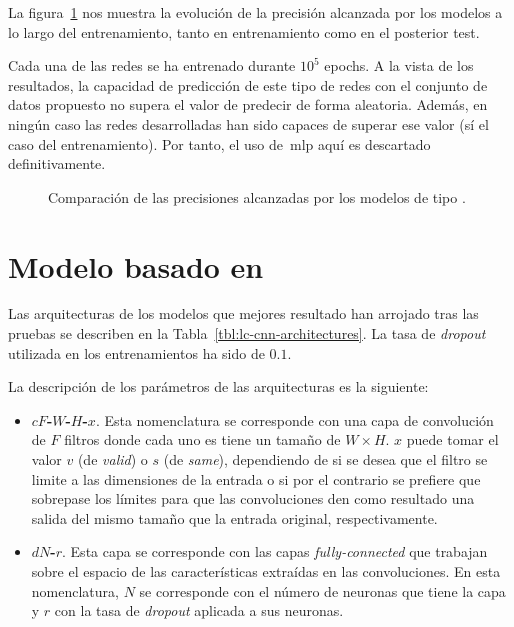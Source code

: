 La figura~\ref{fig:lc-mlp-accuracy-comparison} nos muestra la evolución de la precisión alcanzada por los modelos a lo largo del entrenamiento, tanto en entrenamiento como en el posterior test.

Cada una de las redes se ha entrenado durante $10^5$ epochs. A la vista de los resultados, la capacidad de predicción de este tipo de redes con el conjunto de datos propuesto no supera el valor de predecir de forma aleatoria. Además, en  ningún caso las redes desarrolladas han sido capaces de superar ese valor (sí el caso del entrenamiento). Por tanto, el uso de~\ac{mlp} aquí es descartado definitivamente.

\begin{figure}
	\centering
	\qquad
	\caption[Comparación de las precisiones alcanzadas por los modelos de tipo \acrshort{mlp}]{Comparación de las precisiones alcanzadas por los modelos de tipo .}
	\label{fig:lc-mlp-accuracy-comparison}
\end{figure}

\section{Modelo basado en }

Las arquitecturas de los modelos que mejores resultado han arrojado tras las pruebas se describen en la Tabla~\ref{tbl:lc-cnn-architectures}. La tasa de \textit{dropout} utilizada en los entrenamientos ha sido de $0.1$.

La descripción de los parámetros de las arquitecturas es la siguiente:

\begin{itemize}
	\item \textbf{$cF$-$W$-$H$-$x$}. Esta nomenclatura se corresponde con una capa de convolución de $F$ filtros donde cada uno es tiene un tamaño de $W \times H$. $x$ puede tomar el valor $v$ (de \textit{valid}) o $s$ (de \textit{same}), dependiendo de si se desea que el filtro se limite a las dimensiones de la entrada o si por el contrario se prefiere que sobrepase los límites para que las convoluciones den como resultado una salida del mismo tamaño que la entrada original, respectivamente.
	\item \textbf{$dN$-$r$}. Esta capa se corresponde con las capas \textit{fully-connected} que trabajan sobre el espacio de las características extraídas en las convoluciones. En esta nomenclatura, $N$ se corresponde con el número de neuronas que tiene la capa y $r$ con la tasa de \textit{dropout} aplicada a sus neuronas.
\end{itemize}

